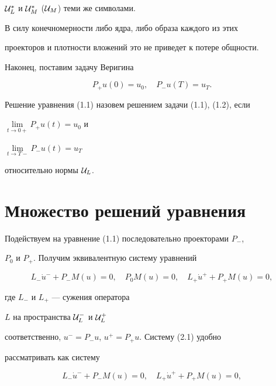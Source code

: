 ${\cal U}_L^*$ и ${\cal U}_M^*$ (${\cal U}_M$) теми же символами.


В силу конечномерности либо ядра, либо образа каждого из этих


проекторов и плотности вложений это не приведет к потере общности.





Наконец, поставим задачу Веригина


\begin{equation}


P_+u(0) = u_0,\quad P_-u(T) = u_T.


\end{equation}


Решение уравнения (1.1) назовем решением задачи (1.1), (1.2), если


$\lim\limits_{t\to 0+} P_+u(t) = u_0$ и\linebreak


$\lim\limits_{t\to T-} P_-u(t) = u_T$


относительно нормы ${\cal U}_L$.








\section{Множество решений уравнения}





Подействуем на уравнение (1.1) последовательно проекторами $P_-$,


$P_0$ и $P_+$. Получим эквивалентную систему уравнений


\begin{equation}


L_-\Dot{u}^- + P_- M(u)=0,\quad P_0 M(u)=0,\quad L_+\Dot{u}^+ +


P_+ M(u)=0,


\end{equation}


где $L_-$ и $L_+$ --- сужения оператора


$L$ на пространства ${\cal U}^-_L$ и ${\cal U}^+_L$


соответственно, $u^- = P_-u$, $u^+ = P_+u$. Систему (2.1) удобно


рассматривать как систему


\begin{equation}


L_-\Dot{u}^- + P_- M(u)=0,\quad


L_+\Dot{u}^+ + P_+ M(u)=0,


\end{equation}


